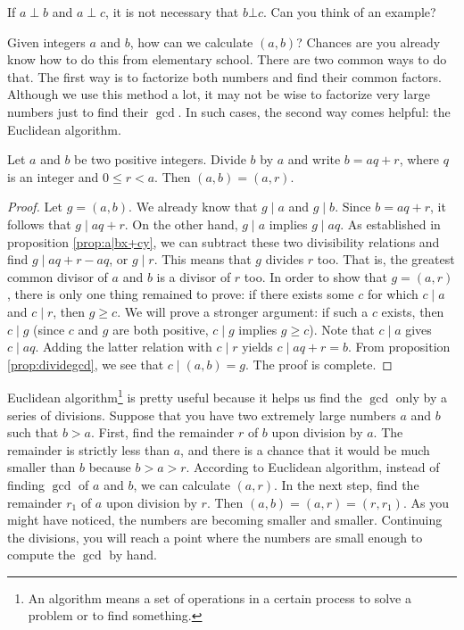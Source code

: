 \begin{note}[2]
	If $a\perp b$ and $a\perp c$, it is not necessary that $b \bot c$. Can you think of an example?
\end{note}

Given integers $a$ and $b$, how can we calculate $(a,b)$? Chances are you already know how to do this from elementary school. There are two common ways to do that. The first way is to factorize both numbers and find their common factors. Although we use this method a lot, it may not be wise to factorize very large numbers just to find their $\gcd$. In such cases, the second way comes helpful: the Euclidean algorithm.

\begin{theorem}
	Let $a$ and $b$ be two positive integers. Divide $b$ by $a$ and write $b=aq+r$, where $q$ is an integer and $0\leq r<a$. Then $(a,b)=(a,r)$.
\end{theorem}

\begin{proof}
	Let $g= (a,b)$. We already know that $g\mid a$ and $g\mid b$. Since $b=aq+r$, it follows that $g\mid aq+r$. On the other hand, $g\mid a$ implies $g\mid aq$. As established in proposition \eqref{prop:a|bx+cy}, we can subtract these two divisibility relations and find $g\mid aq+r-aq$, or $g\mid r$. This means that $g$ divides $r$ too. That is, the greatest common divisor of $a$ and $b$ is a divisor of $r$ too. In order to show that $g=(a,r)$, there is only one thing remained to prove: if there exists some $c$ for which $c\mid a$ and $c\mid r$, then $g \geq c$. We will prove a stronger argument: if such a $c$ exists, then $c\mid g$ (since $c$ and $g$ are both positive, $c\mid g$ implies $g \geq c$). Note that $c\mid a$ gives $c\mid aq$. Adding the latter relation with $c\mid r$ yields $c\mid aq+r = b$. From proposition \eqref{prop:dividegcd}, we see that $c\mid (a,b)=g$. The proof is complete.
\end{proof}

Euclidean algorithm\footnote{An algorithm means a set of operations in a certain process to solve a problem or to find something.} is pretty useful because it helps us find the $\gcd$ only by a series of divisions. Suppose that you have two extremely large numbers $a$ and $b$ such that $b>a$. First, find the remainder $r$ of $b$ upon division by $a$. The remainder is strictly less than $a$, and there is a chance that it would be much smaller than $b$ because $b>a>r$. According to Euclidean algorithm, instead of finding $\gcd$ of $a$ and $b$, we can calculate $(a,r)$. In the next step, find the remainder $r_1$ of $a$ upon division by $r$. Then $(a,b)=(a,r)=(r,r_1)$. As you might have noticed, the numbers are becoming smaller and smaller. Continuing the divisions, you will reach a point where the numbers are small enough to compute the $\gcd$ by hand.


